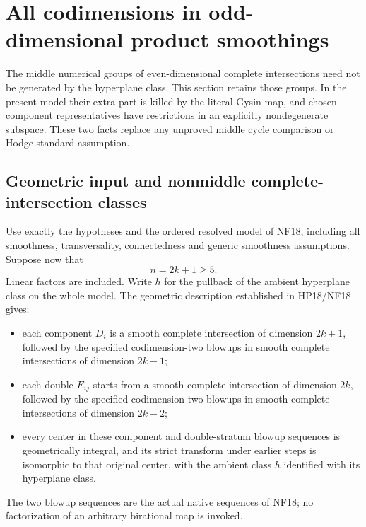 \section{All codimensions in odd-dimensional product smoothings}
\label{r18od:section}

The middle numerical groups of even-dimensional complete intersections
need not be generated by the hyperplane class.  This section retains
those groups.  In the present model their extra part is killed by
the literal Gysin map, and chosen component representatives have
restrictions in an explicitly nondegenerate subspace.  These two
facts replace any unproved middle cycle comparison or Hodge-standard
assumption.

\subsection{Geometric input and nonmiddle complete-intersection classes}

Use exactly the hypotheses and the ordered resolved model of NF18,
including all smoothness, transversality, connectedness and generic
smoothness assumptions.  Suppose now that
\[
                         n=2k+1\ge5.
 \tag{OD18.1}\label{r18od:dimension}
\]
Linear factors are included.  Write $h$ for the pullback of the
ambient hyperplane class on the whole model.  The geometric
description established in HP18/NF18 gives:
\begin{itemize}
\item each component $D_i$ is a smooth complete intersection
of dimension $2k+1$, followed by the specified codimension-two
blowups in smooth complete intersections of dimension $2k-1$;
\item each double $E_{ij}$ starts from a smooth complete intersection
of dimension $2k$, followed by the specified codimension-two
blowups in smooth complete intersections of dimension $2k-2$;
\item every center in these component and double-stratum blowup
sequences is geometrically integral, and its strict transform
under earlier steps is isomorphic to that original center, with
the ambient class $h$ identified with its hyperplane class.
\end{itemize}
The two blowup sequences are the actual native sequences of NF18;
no factorization of an arbitrary birational map is invoked.

